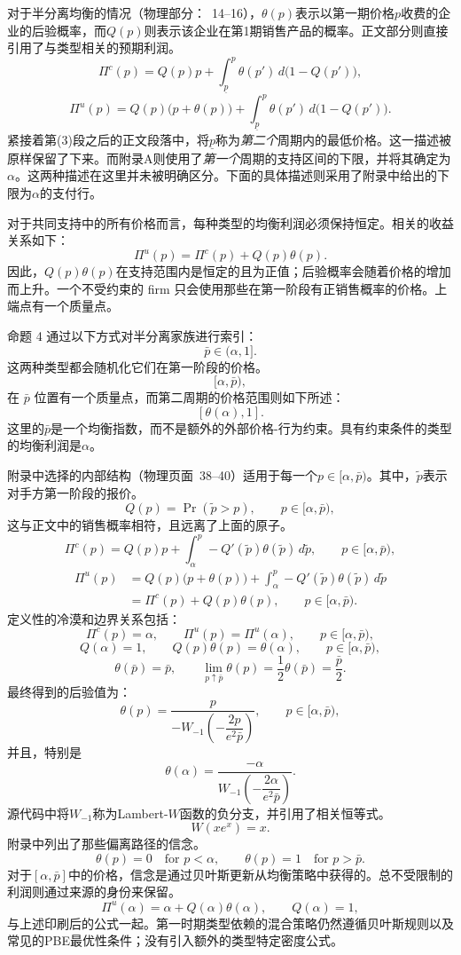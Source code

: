 \documentclass{article}
\begin{document}
对于半分离均衡的情况（物理部分：~14–16），$\theta(p)$表示以第一期价格$p$收费的企业的后验概率，而$Q(p)$则表示该企业在第1期销售产品的概率。正文部分则直接引用了与类型相关的预期利润。
\begin{equation}
\Pi^{c}(p)=Q(p)p+
\int_{\underline p}^{p}\theta(p')\,d\bigl(1-Q(p')\bigr),
\tag{3}
\end{equation}
\begin{equation}
\Pi^{u}(p)=Q(p)\bigl(p+\theta(p)\bigr)+
\int_{\underline p}^{p}\theta(p')\,d\bigl(1-Q(p')\bigr).
\tag{4}
\end{equation}
紧接着第(3)段之后的正文段落中，将$\underline p$称为\emph{第二个}周期内的最低价格。这一描述被原样保留了下来。而附录A则使用了\emph{第一个}周期的支持区间的下限，并将其确定为$\alpha$。这两种描述在这里并未被明确区分。下面的具体描述则采用了附录中给出的下限为$\alpha$的支付行。

对于共同支持中的所有价格而言，每种类型的均衡利润必须保持恒定。相关的收益关系如下：
\[
\Pi^{u}(p)=\Pi^{c}(p)+Q(p)\theta(p).
\]
因此，$Q(p)\theta(p)$在支持范围内是恒定的且为正值；后验概率会随着价格的增加而上升。一个不受约束的 firm 只会使用那些在第一阶段有正销售概率的价格。上端点有一个质量点。

命题 4 通过以下方式对半分离家族进行索引：
\[
\bar p\in(\alpha,1].
\]
这两种类型都会随机化它们在第一阶段的价格。
\[
[\alpha,\bar p),
\]
在 $\bar p$ 位置有一个质量点，而第二周期的价格范围则如下所述：
\[
[\theta(\alpha),1].
\]
这里的$\bar p$是一个均衡指数，而不是额外的外部价格-行为约束。具有约束条件的类型的均衡利润是$\alpha$。

附录中选择的内部结构（物理页面~38–40）适用于每一个$p\in[\alpha,\bar p)$。其中，$\tilde p$表示对手方第一阶段的报价。
\[
Q(p)=\Pr(\tilde p>p),\qquad p\in[\alpha,\bar p),
\]
这与正文中的销售概率相符，且远离了上面的原子。
\[
\Pi^{c}(p)=Q(p)p+
\int_{\alpha}^{p}-Q'(\tilde p)\theta(\tilde p)\,d\tilde p,
\qquad p\in[\alpha,\bar p),
\]
\[
\begin{aligned}
\Pi^{u}(p)
 &=Q(p)\bigl(p+\theta(p)\bigr)
   +\int_{\alpha}^{p}-Q'(\tilde p)\theta(\tilde p)\,d\tilde p\\
 &=\Pi^{c}(p)+Q(p)\theta(p),
\qquad p\in[\alpha,\bar p).
\end{aligned}
\]
定义性的冷漠和边界关系包括：
\[
\Pi^{c}(p)=\alpha,
\qquad
\Pi^{u}(p)=\Pi^{u}(\alpha),
\qquad p\in[\alpha,\bar p),
\]
\[
Q(\alpha)=1,
\qquad
Q(p)\theta(p)=\theta(\alpha),
\qquad p\in[\alpha,\bar p),
\]
\[
\theta(\bar p)=\bar p,
\qquad
\lim_{p\uparrow\bar p}\theta(p)
 =\frac{1}{2}\theta(\bar p)=\frac{\bar p}{2}.
\]
最终得到的后验值为：
\[
\theta(p)=
\frac{p}{-W_{-1}\!\left(-\dfrac{2p}{e^{2}\bar p}\right)},
\qquad p\in[\alpha,\bar p),
\]
并且，特别是
\[
\theta(\alpha)=
\frac{-\alpha}{W_{-1}\!\left(-\dfrac{2\alpha}{e^{2}\bar p}\right)}.
\]
源代码中将$W_{-1}$称为Lambert-$W$函数的负分支，并引用了相关恒等式。
\[
W(xe^{x})=x.
\]
附录中列出了那些偏离路径的信念。
\[
\theta(p)=0\quad\text{for }p<\alpha,
\qquad
\theta(p)=1\quad\text{for }p>\bar p.
\]
对于$[\alpha,\bar p]$中的价格，信念是通过贝叶斯更新从均衡策略中获得的。总不受限制的利润则通过来源的身份来保留。
\[
\Pi^{u}(\alpha)=\alpha+Q(\alpha)\theta(\alpha),
\qquad Q(\alpha)=1,
\]
与上述印刷后的公式一起。第一时期类型依赖的混合策略仍然遵循贝叶斯规则以及常见的PBE最优性条件；没有引入额外的类型特定密度公式。
\end{document}
